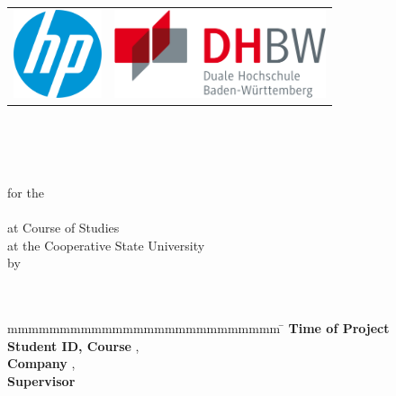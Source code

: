 \begin{titlepage}
    \pagestyle{plain}
	\begin{longtable}{p{} p{}}
	  {\includegraphics[height=2.6cm]{./images/HP_Logo.png}} & 
	  {\includegraphics[height=2.6cm]{./images/DHBW_Logo.png}}
	\end{longtable}
	\enlargethispage{20mm}
	\begin{center}
	    \begin{spacing}{1.5}
	      \vspace*{5mm}	{\LARGE\bf \titel }\\
	      \vspace*{3mm}{\large \subtitel }\\
	    \end{spacing}
	 \end{center}
	 \begin{center}
	    \vspace*{5mm}	{\large\bf \arbeit}\\
        \vspace*{9mm}	for the\\
	    \vspace*{3mm} 	{\bf \abschluss}\\
	    \vspace*{12mm}	at Course of Studies \studiengang\\
	    \vspace*{1mm} 	at the Cooperative State University \dhbw\\
	    \vspace*{12mm}	by\\
	    \vspace*{3mm} 	{\large\bf \autor}\\
	    \vspace*{12mm}	\datumAbgabe\\
	\end{center}
	\vfill
	\begin{spacing}{1.2}
	    \begin{tabbing}
		    mmmmmmmmmmmmmmmmmmmmmmmmmm     \= \kill
		    \textbf{Time of Project}  \>  \zeitraum\\
		    \textbf{Student ID, Course}  \>  \matrikelnr, \kurs\\
		    \textbf{Company}      \>  \firma, \firmenort\\
		    \textbf{Supervisor}              \>  \betreuer
	    \end{tabbing}
	\end{spacing}
\end{titlepage}
